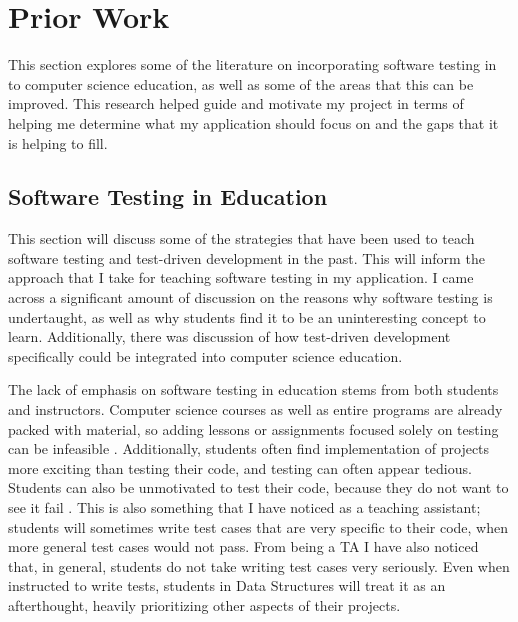 \documentclass[10pt,twocolumn]{article}
\begin{document}
\section{Prior Work}

This section explores some of the literature on incorporating software testing in to computer science education, as well 
as some of the areas that this can be improved. This research helped guide and motivate my project in terms of helping me 
determine what my application should focus on and the gaps that it is helping to fill.



\subsection{Software Testing in Education} 


This section will discuss some of the strategies that have been used to teach software testing and test-driven 
development in the past. This will inform the approach that I take for teaching software testing in my application. 
I came across a significant amount of discussion on the reasons why software testing is undertaught, as well as why 
students find it to be an uninteresting concept to learn. Additionally, there was discussion of how test-driven 
development specifically could be integrated into computer science education. 

The lack of emphasis on software testing in education stems from both students and instructors. Computer science courses 
as well as entire programs are already packed with material, so adding lessons or assignments focused solely on testing 
can be infeasible \cite{Edwards2003Article2}. Additionally, students often find implementation of projects more exciting 
than testing their code, and testing can often appear tedious. Students can also be unmotivated to 
test their code, because they do not want to see it fail \cite{Carrington1997Article}. This is also something that I 
have noticed as a teaching assistant; students will sometimes write test cases that are very specific to their code, 
when more general test cases would not pass. From being a TA I have also noticed that, in general, students do not take 
writing test cases very seriously. Even when instructed to write tests, students in Data Structures will treat it as an 
afterthought, heavily prioritizing other aspects of their projects. 
\end{document}
